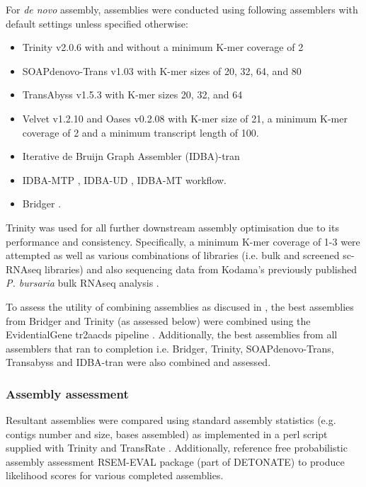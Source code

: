 For \textit{de novo} assembly, assemblies were conducted using following 
assemblers with default settings unless specified otherwise:
\begin{itemize}
    \item Trinity v2.0.6 \citep{Grabherr2011} with and without a minimum K-mer coverage of 2
    \item SOAPdenovo-Trans v1.03 \citep{Xie2014} with K-mer sizes of 20, 32, 64, and 80   
    \item TransAbyss v1.5.3 \citep{Robertson2010} with K-mer sizes 20, 32, and 64 
    \item Velvet v1.2.10 \citep{Zerbino2008} and Oases v0.2.08 \citep{Schulz2012} with K-mer size of 
        21, a minimum K-mer coverage of 2 and a minimum transcript length
        of 100.
    \item Iterative de Bruijn Graph Assembler (IDBA)-tran \citep{Peng2010,Peng2012,Peng2013} 
    \item IDBA-MTP \citep{Leung2014}, IDBA-UD \citep{Peng2012}, IDBA-MT \citep{Leung2013} workflow.
    \item Bridger \citep{Chang2015}.
\end{itemize}

Trinity was used for all further downstream assembly optimisation due to its performance
and consistency.
Specifically, a minimum K-mer coverage of 1-3 were attempted as well as various
combinations of libraries (i.e. bulk and screened sc-RNAseq libraries) and also
sequencing data from Kodama's previously published \textit{P. bursaria} bulk
RNAseq analysis \citep{Kodama2014c}.


To assess the utility of combining assemblies as discused in \citep{Nakasugi2014}, 
the best assemblies from Bridger and Trinity
(as assessed below) were combined using the EvidentialGene tr2aacds pipeline \citep{Gilbert2013}.
Additionally, the best assemblies from all assemblers that ran to completion i.e.
Bridger, Trinity, SOAPdenovo-Trans, Transabyss and IDBA-tran were also combined and 
assessed. 

\subsubsection{Assembly assessment}
\label{sec:assembly_assessment}

Resultant assemblies were compared using standard assembly statistics 
(e.g. contigs number and size, bases assembled) as implemented in a perl script supplied with 
Trinity \citep{Haas2013} and TransRate \citep{Smith-unna2015}. 
Additionally, reference free probabilistic assembly assessment RSEM-EVAL package (part of DETONATE) \citep{Li2014} to
produce likelihood scores for various completed assemblies.

